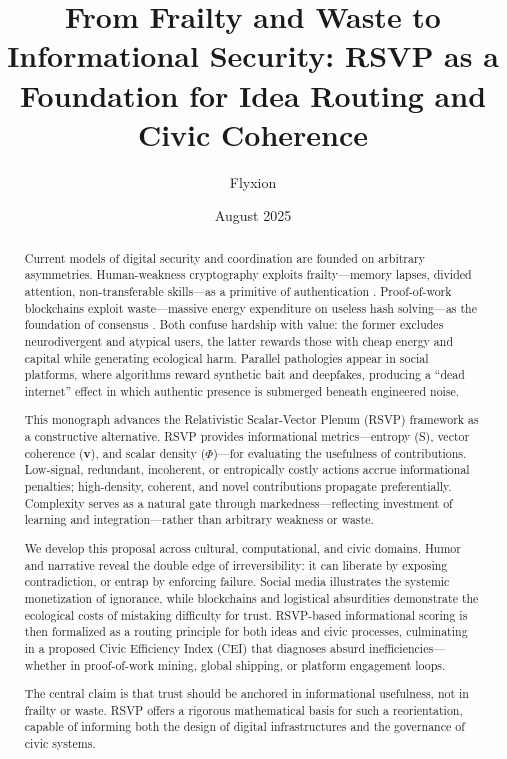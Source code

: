 \documentclass{book}
\title{From Frailty and Waste to Informational Security: RSVP as a Foundation for Idea Routing and Civic Coherence}
\author{Flyxion}
\date{August 2025}
\begin{document}
\maketitle

\tableofcontents

\begin{abstract}
Current models of digital security and coordination are founded on arbitrary asymmetries. Human-weakness cryptography exploits frailty—memory lapses, divided attention, non-transferable skills—as a primitive of authentication \cite{conitzer2020}. Proof-of-work blockchains exploit waste—massive energy expenditure on useless hash solving—as the foundation of consensus \cite{nakamoto2008}. Both confuse hardship with value: the former excludes neurodivergent and atypical users, the latter rewards those with cheap energy and capital while generating ecological harm. Parallel pathologies appear in social platforms, where algorithms reward synthetic bait and deepfakes, producing a “dead internet” effect in which authentic presence is submerged beneath engineered noise.

This monograph advances the Relativistic Scalar-Vector Plenum (RSVP) framework as a constructive alternative. RSVP provides informational metrics—entropy (S), vector coherence (\(\mathbf{v}\)), and scalar density (\(\Phi\))—for evaluating the usefulness of contributions. Low-signal, redundant, incoherent, or entropically costly actions accrue informational penalties; high-density, coherent, and novel contributions propagate preferentially. Complexity serves as a natural gate through markedness—reflecting investment of learning and integration—rather than arbitrary weakness or waste.

We develop this proposal across cultural, computational, and civic domains. Humor and narrative reveal the double edge of irreversibility: it can liberate by exposing contradiction, or entrap by enforcing failure. Social media illustrates the systemic monetization of ignorance, while blockchains and logistical absurdities demonstrate the ecological costs of mistaking difficulty for trust. RSVP-based informational scoring is then formalized as a routing principle for both ideas and civic processes, culminating in a proposed Civic Efficiency Index (CEI) that diagnoses absurd inefficiencies—whether in proof-of-work mining, global shipping, or platform engagement loops.

The central claim is that trust should be anchored in informational usefulness, not in frailty or waste. RSVP offers a rigorous mathematical basis for such a reorientation, capable of informing both the design of digital infrastructures and the governance of civic systems.
\end{abstract}
\end{document}
